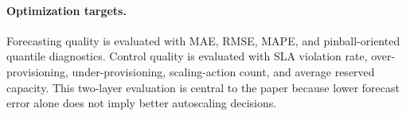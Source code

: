 \paragraph{Optimization targets.}
Forecasting quality is evaluated with MAE, RMSE, MAPE, and pinball-oriented quantile diagnostics. Control quality is evaluated with SLA violation rate, over-provisioning, under-provisioning, scaling-action count, and average reserved capacity. This two-layer evaluation is central to the paper because lower forecast error alone does not imply better autoscaling decisions.
